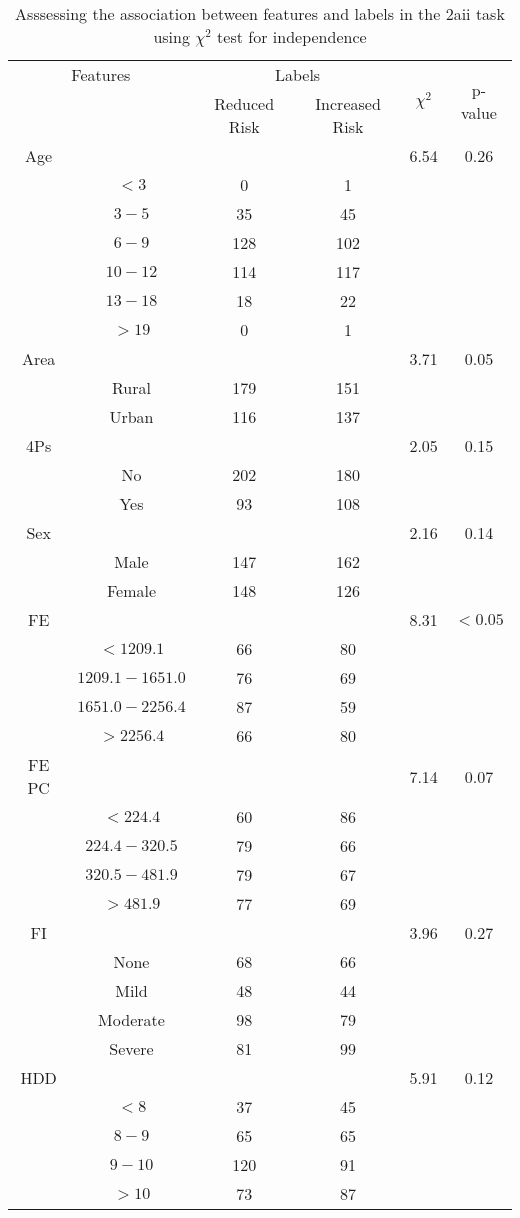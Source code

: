 \begin{table}[!htb]
\centering
\caption{Asssessing the association between features and labels in the 2aii task using $\chi^2$ test for independence}
\label{tab:chitest_2aii}
\begin{tabular}{c c | c c| c | c}
\hline
\multicolumn{2}{c|}{Features}& \multicolumn{2}{c|}{Labels}& \multirow{2}{*}{$\chi^2$} & \multirow{2}{*}{p-value}\\ 
& & Reduced Risk & Increased Risk & & \\ 
\hline
Age &  &  & & 6.54 & 0.26 \\ 
& $< 3$ & 0 & 1& & \\ 
& $3-5$ & 35 & 45& & \\ 
& $6-9$ & 128 & 102& & \\ 
& $10-12$ & 114 & 117& & \\ 
& $13-18$ & 18 & 22& & \\ 
& $> 19$ & 0 & 1& & \\ 
\hline 
Area &  &  & & 3.71 & 0.05 \\ 
& Rural & 179 & 151& & \\ 
& Urban & 116 & 137& & \\ 
\hline 
4Ps &  &  & & 2.05 & 0.15 \\ 
& No & 202 & 180& & \\ 
& Yes & 93 & 108& & \\ 
\hline 
Sex &  &  & & 2.16 & 0.14 \\ 
& Male & 147 & 162& & \\ 
& Female & 148 & 126& & \\ 
\hline 
FE &  &  & & 8.31 & $< 0.05$ \\ 
& $< 1209.1$ & 66 & 80& & \\ 
& $1209.1-1651.0$ & 76 & 69& & \\ 
& $1651.0-2256.4$ & 87 & 59& & \\ 
& $> 2256.4$ & 66 & 80& & \\ 
\hline 
FE PC &  &  & & 7.14 & 0.07 \\ 
& $< 224.4$ & 60 & 86& & \\ 
& $224.4-320.5$ & 79 & 66& & \\ 
& $320.5-481.9$ & 79 & 67& & \\ 
& $> 481.9$ & 77 & 69& & \\ 
\hline 
FI &  &  & & 3.96 & 0.27 \\ 
& None & 68 & 66& & \\ 
& Mild & 48 & 44& & \\ 
& Moderate & 98 & 79& & \\ 
& Severe & 81 & 99& & \\ 
\hline 
HDD &  &  & & 5.91 & 0.12 \\ 
& $< 8$ & 37 & 45& & \\ 
& $8-9$ & 65 & 65& & \\ 
& $9-10$ & 120 & 91& & \\ 
& $> 10$ & 73 & 87& & \\ 
\hline 
\end{tabular}
\end{table}
